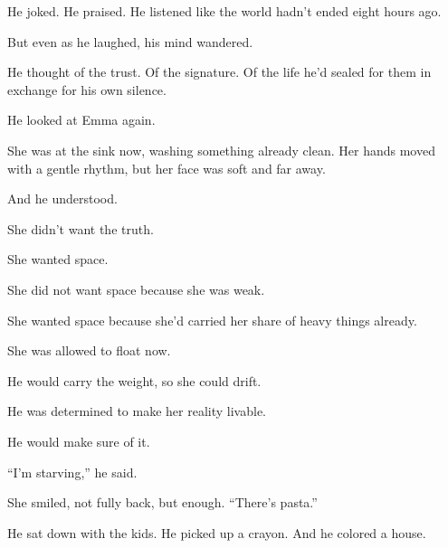 He joked. He praised. He listened like the world hadn’t ended eight hours ago.

But even as he laughed, his mind wandered.

He thought of the trust.
Of the signature.
Of the life he’d sealed for them in exchange for his own silence.

He looked at Emma again.

She was at the sink now, washing something already clean. Her hands moved with a gentle rhythm, 
but her face was soft and far away.

And he understood.

She didn’t want the truth.

She wanted space.

She did not want space because she was weak.

She wanted space because she’d carried her share of heavy things already. 

She was allowed to float now. 

He would carry the weight, so she could drift.

He was determined to make her reality livable.

He would make sure of it.

``I’m starving,'' he said.

She smiled, not fully back, but enough. ``There’s pasta.''

He sat down with the kids. He picked up a crayon. And he colored a house.

\medskip

